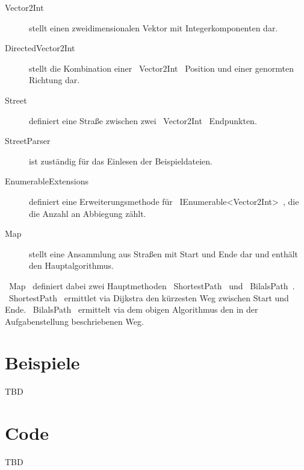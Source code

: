 \documentclass{article}
\theoremstyle{nonumberplain}
\begin{document}
\begin{description}
    \item[Vector2Int] stellt einen zweidimensionalen Vektor mit Integerkomponenten dar.
    \item[DirectedVector2Int] stellt die Kombination einer ~Vector2Int~ Position und einer genormten Richtung dar.
    \item[Street] definiert eine Straße zwischen zwei ~Vector2Int~ Endpunkten.
    \item[StreetParser] ist zuständig für das Einlesen der Beispieldateien.
    \item[EnumerableExtensions] definiert eine Erweiterungsmethode für ~IEnumerable<Vector2Int>~, die die Anzahl an Abbiegung zählt.
    \item[Map] stellt eine Ansammlung aus Straßen mit Start und Ende dar und enthält den Hauptalgorithmus. 
\end{description}

~Map~ definiert dabei zwei Hauptmethoden
~ShortestPath~ und ~BilalsPath~.
~ShortestPath~ ermittlet via Dijkstra den kürzesten Weg zwischen Start und Ende.
~BilalsPath~ ermittelt via dem obigen Algorithmus den in der Aufgabenstellung beschriebenen Weg.

\section{Beispiele}

TBD

\section{Code}

TBD
\end{document}
